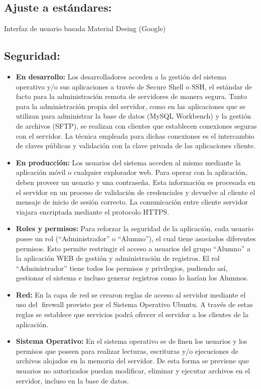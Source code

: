     \subsection{Ajuste a estándares:} Interfaz de usuario basada Material Desing (Google)

    \subsection{Seguridad:} 
      \begin{itemize}
        
        \item \textbf{En desarrollo:} Los desarrolladores acceden a la gestión del sistema operativo y/o sus aplicaciones a través de Secure Shell o SSH, el estándar de facto para la administración remota de servidores de manera segura. Tanto para la administración propia del servidor, como en las aplicaciones que se utilizan para administrar la base de datos (MySQL Workbench) y la gestión de archivos (SFTP), se realizan con clientes que establecen conexiones seguras con el servidor. La técnica empleada para dichas conexiones es el intercambio de claves públicas y validación con la clave privada de las aplicaciones cliente.
        \item \textbf{En producción:} Los usuarios del sistema acceden al mismo mediante la aplicación móvil o cualquier explorador web. Para operar con la aplicación, deben proveer un usuario y una contraseña. Esta información es procesada en el servidor en un proceso de validación de credenciales y devuelve al cliente el mensaje de inicio de sesión correcto. La comunicación entre cliente servidor viajara encriptada mediante el protocolo HTTPS.
        \item \textbf{Roles y permisos:} Para reforzar la seguridad de la aplicación, cada usuario posee un rol (``Administrador'' o ``Alumno''), el cual tiene asociados diferentes permisos. Esto permite restringir el acceso a usuarios del grupo ``Alumno'' a la aplicación WEB de gestión y administración de registros. El rol ``Administrador'' tiene todos los permisos y privilegios, pudiendo así, gestionar el sistema e incluso generar registros como lo harían los Alumnos.
        \item \textbf{Red:} En la capa de red se crearon reglas de acceso al servidor mediante el uso del firewall provisto por el Sistema Operativo Ubuntu. A través de estas reglas se establece que servicios podrá ofrecer el servidor a los clientes de la aplicación.
        \item \textbf{Sistema Operativo:} En el sistema operativo se definen los usuarios y los permisos que poseen para realizar lecturas, escrituras y/o ejecuciones de archivos alojados en la memoria del servidor. De esta forma se previene que usuarios no autorizados puedan modificar, eliminar y ejecutar archivos en el servidor, incluso en la base de datos.

\end{itemize}
